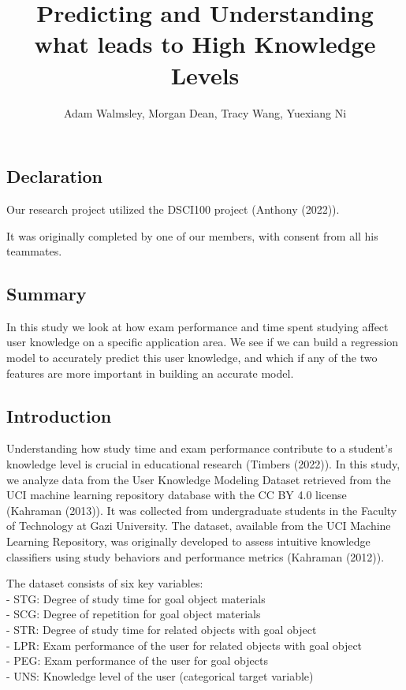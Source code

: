 \documentclass[
  letterpaper,
  DIV=11,
  numbers=noendperiod]{scrartcl}
\title{Predicting and Understanding what leads to High Knowledge Levels}
\author{Adam Walmsley, Morgan Dean, Tracy Wang, Yuexiang Ni}
\date{}
\begin{document}
\maketitle


\subsection{\texorpdfstring{\textbf{Declaration}}{Declaration}}\label{declaration}

Our research project utilized the DSCI100 project (Anthony (2022)).

It was originally completed by one of our members, with consent from all
his teammates.

\subsection{\texorpdfstring{\textbf{Summary}}{Summary}}\label{summary}

In this study we look at how exam performance and time spent studying
affect user knowledge on a specific application area. We see if we can
build a regression model to accurately predict this user knowledge, and
which if any of the two features are more important in building an
accurate model.

\subsection{\texorpdfstring{\textbf{Introduction}}{Introduction}}\label{introduction}

Understanding how study time and exam performance contribute to a
student's knowledge level is crucial in educational research (Timbers
(2022)). In this study, we analyze data from the User Knowledge Modeling
Dataset retrieved from the UCI machine learning repository database with
the CC BY 4.0 license (Kahraman (2013)). It was collected from
undergraduate students in the Faculty of Technology at Gazi University.
The dataset, available from the UCI Machine Learning Repository, was
originally developed to assess intuitive knowledge classifiers using
study behaviors and performance metrics (Kahraman (2012)).

The dataset consists of six key variables:\\
- STG: Degree of study time for goal object materials\\
- SCG: Degree of repetition for goal object materials\\
- STR: Degree of study time for related objects with goal object\\
- LPR: Exam performance of the user for related objects with goal
object\\
- PEG: Exam performance of the user for goal objects\\
- UNS: Knowledge level of the user (categorical target variable)
\end{document}
